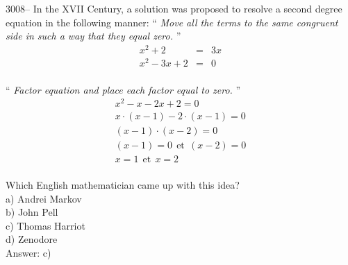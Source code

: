 \documentclass[letterpaper, 12pt]{article}
\begin{document}
3008-- In the XVII Century, a solution was proposed to resolve a second degree equation in the following manner: `` \emph{Move all the terms to the same congruent side in such a way that they equal zero.} ''
\begin{eqnarray*}
x^{2} + 2 &=& 3x\\
x^{2} - 3x +2 &=& 0
\end{eqnarray*}\\
`` \emph{Factor equation and place each factor equal to zero.} ''
\begin{eqnarray*}
x^{2} - x - 2x +2 = 0\\
x\cdot(x - 1) - 2\cdot(x - 1) = 0\\
(x - 1)\cdot(x - 2) = 0\\
(x - 1) = 0 \ \ \textrm{et} \ \ (x - 2) = 0\\
x = 1 \ \ \textrm{et} \ \ x = 2
\end{eqnarray*}\\
Which English mathematician came up with this idea?\\

a) Andrei Markov\\
b) John Pell\\
c) Thomas Harriot\\
d) Zenodore\\

Answer: c)\\
\end{document}
